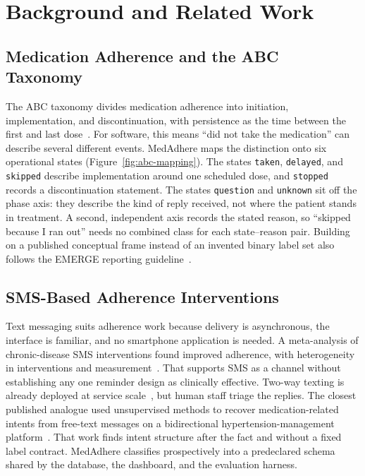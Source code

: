 \chapter{Background and Related Work}
\label{ch:background}

\section{Medication Adherence and the ABC Taxonomy}

The ABC taxonomy divides medication adherence into initiation,
implementation, and discontinuation, with persistence as the time between the
first and last dose~\cite{vrijens2012taxonomy}. For software, this means ``did
not take the medication'' can describe several different events. MedAdhere maps
the distinction onto six operational states (Figure~\ref{fig:abc-mapping}).
The states \texttt{taken}, \texttt{delayed}, and \texttt{skipped} describe
implementation around one scheduled dose, and \texttt{stopped} records a
discontinuation statement. The states \texttt{question} and \texttt{unknown}
sit off the phase axis: they describe the kind of reply received, not where the
patient stands in treatment. A second, independent axis records the stated
reason, so ``skipped because I ran out'' needs no combined class for each
state--reason pair. Building on a published conceptual frame instead of an
invented binary label set also follows the EMERGE reporting
guideline~\cite{degeest2018emerge}.



\section{SMS-Based Adherence Interventions}

Text messaging suits adherence work because delivery is asynchronous, the
interface is familiar, and no smartphone application is needed. A
meta-analysis of chronic-disease SMS interventions found improved adherence,
with heterogeneity in interventions and measurement~\cite{thakkar2016sms}. That
supports SMS as a channel without establishing any one reminder design as
clinically effective. Two-way texting is already deployed at service
scale~\cite{feldacker2024twoway}, but human staff triage the replies. The
closest published analogue used unsupervised methods to recover
medication-related intents from free-text messages on a bidirectional
hypertension-management platform~\cite{davoudi2022intents}. That work finds
intent structure after the fact and without a fixed label contract. MedAdhere
classifies prospectively into a predeclared schema shared by the database, the
dashboard, and the evaluation harness.


